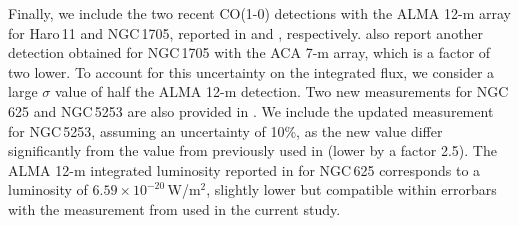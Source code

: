 \documentclass{aa}
\newcommand{\toadd}[1]{{\color{red}{{[TO ADD: \bf #1]}}}}
\begin{document}
Finally, we include the two recent CO(1-0) detections with the ALMA 12-m array for Haro\,11 and NGC\,1705, reported in \cite{Gao_Haro11_2022} and \cite{Hunt_2023}, respectively. \cite{Hunt_2023} also report another detection obtained for NGC\,1705  with the ACA 7-m array, which is a factor of two lower. To account for this uncertainty on the integrated flux, we consider a large $\sigma$ value of half the ALMA 12-m detection. Two new measurements for NGC\,625 and NGC\,5253 are also provided in \cite{Hunt_2023}. We include the updated measurement for NGC\,5253, assuming an uncertainty of 10\%, as the new value differ significantly from the value from \cite{Taylor_1998} previously used in  (lower by a factor 2.5). The ALMA 12-m integrated luminosity reported in \cite{Hunt_2023} for NGC\,625 corresponds to a luminosity of $6.59 \times 10^{-20}$\,W/m$^2$, slightly lower but compatible within errorbars with the measurement from \cite{Cormier_2014} used in the current study. 
\end{document}
